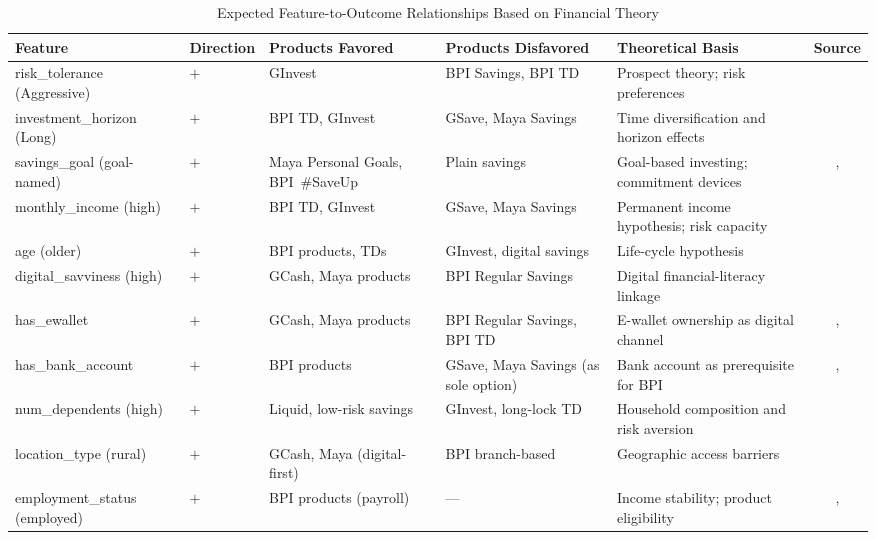 \documentclass[journal]{./IEEE/IEEEtran}
\begin{document}
\begin{table}[t]
    \centering
    \caption{Expected Feature-to-Outcome Relationships Based on Financial Theory}
    \label{tab:feat-outcome}
    \small
    \begin{tabular}{|l|p{1.3cm}|p{3.5cm}|p{3.0cm}|p{3.5cm}|c|}
        \hline
        \textbf{Feature} & \textbf{Direction} & \textbf{Products Favored} & \textbf{Products Disfavored} & \textbf{Theoretical Basis} & \textbf{Source} \\
        \hline
        risk\_tolerance (Aggressive) & $+$ & GInvest & BPI Savings, BPI TD & Prospect theory; risk preferences & \cite{ref62} \\
        \hline
        investment\_horizon (Long) & $+$ & BPI TD, GInvest & GSave, Maya Savings & Time diversification and horizon effects & \cite{ref84} \\
        \hline
        savings\_goal (goal-named) & $+$ & Maya Personal Goals, BPI~\#SaveUp & Plain savings & Goal-based investing; commitment devices & \cite{ref63}, \cite{ref85} \\
        \hline
        monthly\_income (high) & $+$ & BPI TD, GInvest & GSave, Maya Savings & Permanent income hypothesis; risk capacity & \cite{ref64} \\
        \hline
        age (older) & $+$ & BPI products, TDs & GInvest, digital savings & Life-cycle hypothesis & \cite{ref65} \\
        \hline
        digital\_savviness (high) & $+$ & GCash, Maya products & BPI Regular Savings & Digital financial-literacy linkage & \cite{ref66} \\
        \hline
        has\_ewallet & $+$ & GCash, Maya products & BPI Regular Savings, BPI TD & E-wallet ownership as digital channel & \cite{ref35}, \cite{ref66} \\
        \hline
        has\_bank\_account & $+$ & BPI products & GSave, Maya Savings (as sole option) & Bank account as prerequisite for BPI & \cite{ref35}, \cite{ref66} \\
        \hline
        num\_dependents (high) & $+$ & Liquid, low-risk savings & GInvest, long-lock TD & Household composition and risk aversion & \cite{ref55} \\
        \hline
        location\_type (rural) & $+$ & GCash, Maya (digital-first) & BPI branch-based & Geographic access barriers & \cite{ref35} \\
        \hline
        employment\_status (employed) & $+$ & BPI products (payroll) & --- & Income stability; product eligibility & \cite{ref64}, \cite{ref41} \\

\end{tabular}
\end{table}
\end{document}

